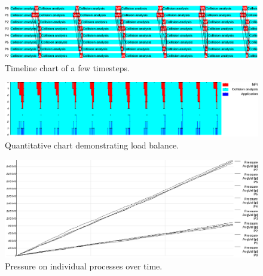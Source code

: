 \documentclass[a4paper,11pt]{article}
\begin{document}
\begin{figure}[!h]
  \caption{Timeline chart of a few timesteps.}
  \label{timeline}
  \includegraphics[width=15cm]{chart_load_balance.png}
\end{figure}

\begin{figure}[!h]
  \caption{Quantitative chart demonstrating load balance.}
  \label{quantitative}
  \includegraphics[width=15cm]{chart_quantitative.png}
\end{figure}

\begin{figure}[!h]
  \caption{Pressure on individual processes over time.}
  \label{pressure}
  \includegraphics[width=15cm]{chart_pressure.png}
\end{figure}

\clearpage
\end{document}
